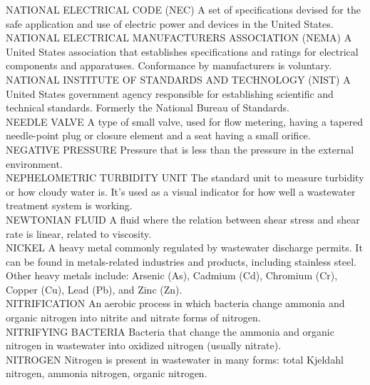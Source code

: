\documentclass{article}
\begin{document}
NATIONAL ELECTRICAL CODE (NEC)
A set of specifications devised for the safe application and use of electric power and devices in the United States.
\vspace{0.3cm}\\
NATIONAL ELECTRICAL MANUFACTURERS ASSOCIATION (NEMA)
A United States association that establishes specifications and ratings for electrical components and apparatuses. Conformance by manufacturers is voluntary.
\vspace{0.3cm}\\
NATIONAL INSTITUTE OF STANDARDS AND TECHNOLOGY (NIST)
A United States government agency responsible for establishing scientific and technical standards. Formerly the National Bureau of Standards.
\vspace{0.3cm}\\
NEEDLE VALVE
A type of small valve, used for flow metering, having a tapered needle-point plug or closure element and a seat having a small orifice.
\vspace{0.3cm}\\
NEGATIVE PRESSURE
Pressure that is less than the pressure in the external environment.
\vspace{0.3cm}\\
NEPHELOMETRIC TURBIDITY UNIT
The standard unit to measure turbidity or how cloudy water is. It’s used as a visual indicator for how well a wastewater treatment system is working.
\vspace{0.3cm}\\
NEWTONIAN FLUID
A fluid where the relation between shear stress and shear rate is linear, related to viscosity.
\vspace{0.3cm}\\
NICKEL
A heavy metal commonly regulated by wastewater discharge permits. It can be found in metals-related industries and products, including stainless steel. Other heavy metals include: Arsenic (As), Cadmium (Cd), Chromium (Cr), Copper (Cu), Lead (Pb), and Zinc (Zn).
\vspace{0.3cm}\\
NITRIFICATION
An aerobic process in which bacteria change ammonia and organic nitrogen into nitrite and nitrate forms of nitrogen.
\vspace{0.3cm}\\
NITRIFYING BACTERIA
Bacteria that change the ammonia and organic nitrogen in wastewater into oxidized nitrogen (usually nitrate).
\vspace{0.3cm}\\
NITROGEN
Nitrogen is present in wastewater in many forms: total Kjeldahl nitrogen, ammonia nitrogen, organic nitrogen.
\end{document}
